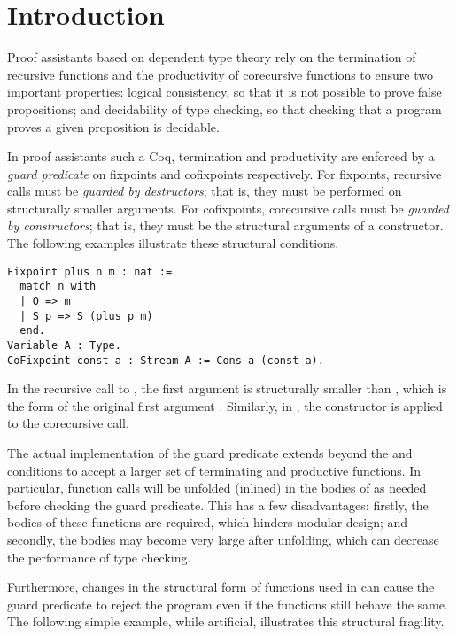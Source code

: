 \section{Introduction}\label{sec:intro}

Proof assistants based on dependent type theory rely on the termination of recursive functions and the productivity of corecursive functions to ensure two important properties: logical consistency, so that it is not possible to prove false propositions; and decidability of type checking, so that checking that a program proves a given proposition is decidable.

In proof assistants such a Coq, termination and productivity are enforced by a \emph{guard predicate} on fixpoints and cofixpoints respectively.
For fixpoints, recursive calls must be \emph{guarded by destructors}; that is, they must be performed on structurally smaller arguments.
For cofixpoints, corecursive calls must be \emph{guarded by constructors}; that is, they must be the structural arguments of a constructor.
The following examples illustrate these structural conditions.

\begin{samepage}
\begin{verbatim}
Fixpoint plus n m : nat :=
  match n with
  | O => m
  | S p => S (plus p m)
  end.
Variable A : Type.
CoFixpoint const a : Stream A := Cons a (const a).
\end{verbatim}
\end{samepage}

In the recursive call to , the first argument  is structurally smaller than , which is the form of the original first argument . Similarly, in , the constructor  is applied to the corecursive call.

The actual implementation of the guard predicate extends beyond the \guardedbydestructors and \guardedbyconstructors conditions to accept a larger set of terminating and productive functions.
In particular, function calls will be unfolded (\ie inlined) in the bodies of \cofixpoints as needed before checking the guard predicate.
This has a few disadvantages: firstly, the bodies of these functions are required, which hinders modular design; and secondly, the \cofixpoint bodies may become very large after unfolding, which can decrease the performance of type checking.

Furthermore, changes in the structural form of functions used in \cofixpoints can cause the guard predicate to reject the program even if the functions still behave the same.
The following simple example, while artificial, illustrates this structural fragility.

